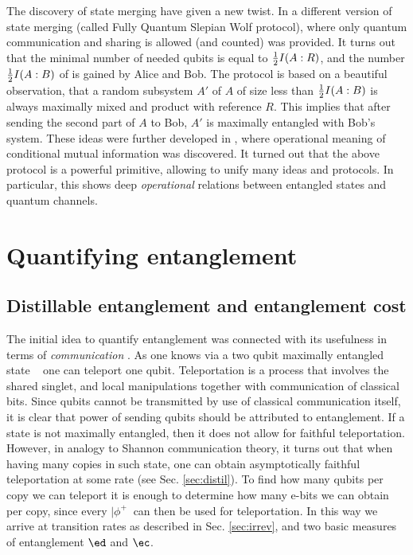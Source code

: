 \documentclass[twocolumn,aps,rmp]{revtex4}
\begin{document}
The discovery of state merging have given a new twist.
In \cite{AbeyesingheDHW2006-fullSW} a different version of
state merging (called Fully Quantum Slepian Wolf  protocol), where only quantum communication and  sharing \eprpairs  is allowed (and counted) was provided.
It turns out that the minimal number of needed
qubits is equal to ${1\over 2} I(A:R)$, and the number
${1\over 2} I(A:B)$ of \eprpairs is gained by Alice and Bob.
The protocol is based on a beautiful observation,
that a random subsystem $A'$ of $A$ of size less than ${1\over 2}I(A:B)$
is always maximally mixed and product with reference $R$. This implies that
after sending the second part of $A$ to Bob, $A'$ is maximally entangled
with Bob's system. These ideas were further developed in
\cite{DevetakY2006-cond-info}, where operational meaning of
conditional mutual information was  discovered.
It turned out that the above protocol is a powerful primitive,
allowing to unify many ideas and protocols. In particular, this
shows deep {\it operational} relations between entangled
states and quantum channels.

\section{Quantifying entanglement}
\label{sec:miary}
\subsection{Distillable entanglement and entanglement cost}
\label{subsec:edec} The initial idea to quantify entanglement was
connected with its usefulness in terms of {\it communication}
\cite{BBPSSW1996,BDSW1996}. As one knows via a two qubit maximally
entangled state {\it \singlet\ }  one can teleport one qubit.
Teleportation is a process that involves the shared singlet, and
local manipulations together with communication of classical bits.
Since qubits cannot be transmitted by use of classical communication
itself, it is clear that power of sending qubits should be
attributed to entanglement. If a state is not maximally entangled,
then it does not allow for faithful teleportation. However, in
analogy to Shannon communication theory, it turns out that when
having many copies in such  state, one can obtain asymptotically
faithful teleportation at some rate (see Sec. \ref{sec:distil}).
To find how many qubits per copy we can teleport it is enough to
determine how many e-bits we can obtain per copy, since every
$|\phi^+\>$ can then be used for teleportation. In this way we arrive
at transition rates as described in Sec. \ref{sec:irrev}, and two
basic measures of entanglement $\ed$ and $\ec$.
\end{document}
